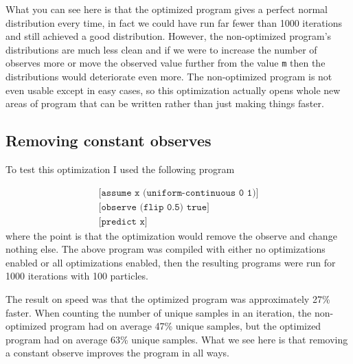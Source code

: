 \documentclass[a4paper]{article}
\begin{document}
What you can see here is that the optimized program gives a perfect normal distribution every time, in fact we could have run far fewer than 1000 iterations and still achieved a good distribution. However, the non-optimized program's distributions are much less clean and if we were to increase the number of observes more or move the observed value further from the value \texttt{m} then the distributions would deteriorate even more. The non-optimized program is not even usable except in easy cases, so this optimization actually opens whole new areas of program that can be written rather than just making things faster.




\subsection{Removing constant observes}

To test this optimization I used the following program

\[
	\begin{array}{l}
		\texttt{[assume x (uniform-continuous 0 1)]} \\
		\texttt{[observe (flip 0.5) true]} \\
		\texttt{[predict x]}
	\end{array}
\]
where the point is that the optimization would remove the observe and change nothing else. The above program was compiled with either no optimizations enabled or all optimizations enabled, then the resulting programs were run for 1000 iterations with 100 particles.

The result on speed was that the optimized program was approximately 27\% faster. When counting the number of unique samples in an iteration, the non-optimized program had on average 47\% unique samples, but the optimized program had on average 63\% unique samples. What we see here is that removing a constant observe improves the program in all ways.



{}

\end{document}
